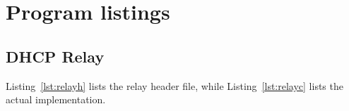 \newpage
\section{Program listings}
\subsection{DHCP Relay}
Listing~\ref{lst:relayh} lists the relay header file, while Listing~\ref{lst:relayc} lists the actual implementation.

